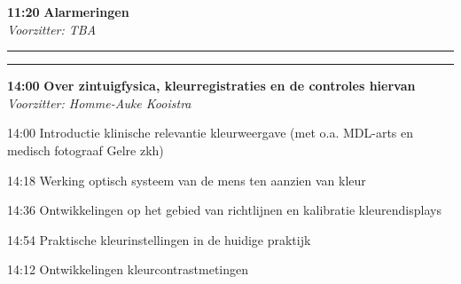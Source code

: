 \documentclass[a4paper,10pt]{report}
\begin{document}
\begin{multicols*}{3}
{} %
\begin{packed_enum}
\item[\textbf{11:20}] \textbf{Alarmeringen}\\\textit{Voorzitter: TBA}
\end{packed_enum} %


\hrule \vspace{0mm}
\hrule\strut
\vfill

\begin{packed_enum}
\item[\textbf{14:00}] \textbf{Over zintuigfysica, kleurregistraties en de controles hiervan}\\\textit{Voorzitter: Homme-Auke Kooistra}
\item[14:00] Introductie klinische relevantie kleurweergave (met o.a. MDL-arts en medisch fotograaf Gelre zkh)
\item[14:18] Werking optisch systeem van de mens ten aanzien van kleur
\item[14:36] Ontwikkelingen op het gebied van richtlijnen en kalibratie kleurendisplays
\item[14:54] Praktische kleurinstellingen in de huidige praktijk
\item[14:12] Ontwikkelingen kleurcontrastmetingen
\end{packed_enum} %


\end{multicols*}
\end{document}

